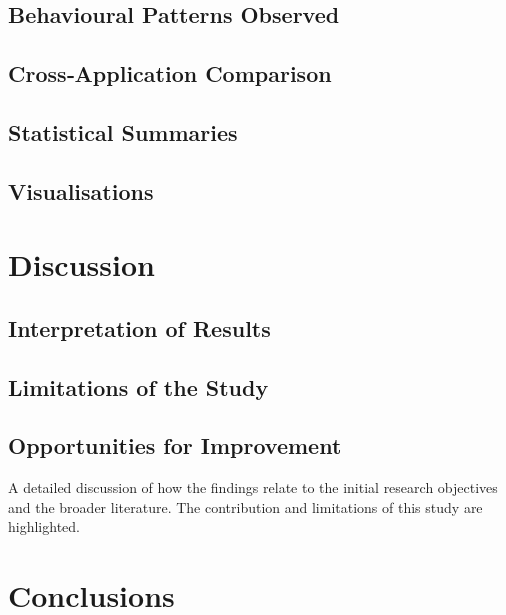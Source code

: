 \documentclass[a4paper,12pt]{report}
\begin{document}
\section{Behavioural Patterns Observed}\label{sec:results:patterns}

\section{Cross‑Application Comparison}\label{sec:results:comparison}

\section{Statistical Summaries}\label{sec:results:stats}

\section{Visualisations}\label{sec:results:viz}

\chapter{Discussion}

\section{Interpretation of Results}

\section{Limitations of the Study}

\section{Opportunities for Improvement}


A detailed discussion of how the findings relate to the initial research objectives and the broader literature. The contribution and limitations of this study are highlighted.

\chapter{Conclusions}
\end{document}
